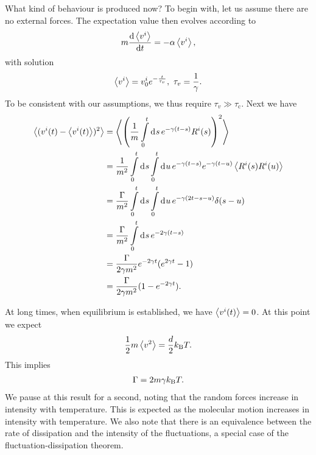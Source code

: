 What kind of behaviour is produced now? To begin with, let us assume there are no external forces. The expectation value then evolves according to
\begin{align*}
	m\dv{\expval{v^{i}}}{t} =  -\alpha\expval{v^{i}},
\end{align*}
with solution
\begin{align*}
	\expval{v^{i}} = v^{i}_{0}e^{-\frac{t}{\tau_{v}}},\ \tau_{v} = \frac{1}{\gamma}.
\end{align*}
To be consistent with our assumptions, we thus require $\tau_{v} \gg \tau_{\text{c}}$. Next we have
\begin{align*}
	\expval{(v^{i}(t) - \expval{v^{i}(t)})^{2}} &= \expval{\left(\frac{1}{m}\int\limits_{0}^{t}\dd[]{s}e^{-\gamma(t - s)}R^{i}(s)\right)^{2}} \\
	                                            &= \frac{1}{m^{2}}\int\limits_{0}^{t}\dd[]{s}\int\limits_{0}^{t}\dd[]{u}e^{-\gamma(t - s)}e^{-\gamma(t - u)}\expval{R^{i}(s)R^{i}(u)} \\
	                                            &= \frac{\Gamma}{m^{2}}\int\limits_{0}^{t}\dd[]{s}\int\limits_{0}^{t}\dd[]{u}e^{-\gamma(2t - s - u)}\delta(s - u) \\
	                                            &= \frac{\Gamma}{m^{2}}\int\limits_{0}^{t}\dd[]{s}e^{-2\gamma(t - s)} \\
	                                            &= \frac{\Gamma}{2\gamma m^{2}}e^{-2\gamma t}(e^{2\gamma t} - 1) \\
	                                            &= \frac{\Gamma}{2\gamma m^{2}}(1 - e^{-2\gamma t}).
\end{align*}

At long times, when equilibrium is established, we have $\expval{v^{i}(t)} = 0$. At this point we expect
\begin{align*}
	\frac{1}{2}m\expval{v^{2}} = \frac{d}{2}k_{\text{B}} T.
\end{align*}
This implies
\begin{align*}
	\Gamma = 2m\gamma k_{\text{B}} T.
\end{align*}
We pause at this result for a second, noting that the random forces increase in intensity with temperature. This is expected as the molecular motion increases in intensity with temperature. We also note that there is an equivalence between the rate of dissipation and the intensity of the fluctuations, a special case of the fluctuation-dissipation theorem.

